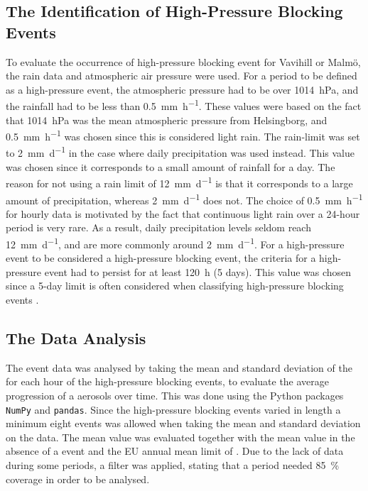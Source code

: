 \subsection{The Identification of High-Pressure Blocking Events}
To evaluate the occurrence of high-pressure blocking event for Vavihill or Malmö, the rain data and atmospheric air pressure were used. For a period to be defined as a high-pressure event, the atmospheric pressure had to be over \SI{1014}{\hecto\pascal}, and the rainfall had to be less than \SI{0.5}{\mm\per\hour}. These values were based on the fact that \SI{1014}{\hecto\pascal} was the mean atmospheric pressure from Helsingborg, and \SI{0.5}{\mm\per\hour} was chosen since this is considered light rain. The rain-limit was set to \SI{2}{\mm\per\day} in the case where daily precipitation was used instead. This value was chosen since it corresponds to a small amount of rainfall for a day. The reason for not using a rain limit of \SI{12}{\mm\per\day} is that it corresponds to a large amount of precipitation, whereas \SI{2}{\mm\per\day} does not. The choice of \SI{0.5}{\mm\per\hour} for hourly data is motivated by the fact that continuous light rain over a 24-hour period is very rare. As a result, daily precipitation levels seldom reach \SI{12}{\mm\per\day}, and are more commonly around \SI{2}{\mm\per\day}. For a high-pressure event to be considered a high-pressure blocking event, the criteria for a high-pressure event had to persist for at least \SI{120}{\hour} (5 days). This value was chosen since a 5-day limit is often considered when classifying high-pressure blocking events \cite{lupoAtmosphericBlockingEvents2020}. 

\subsection{The Data Analysis}
The event data was analysed by taking the mean and standard deviation of the \PM for each hour of the high-pressure blocking events, to evaluate the average progression of a aerosols over time. This was done using the Python packages \texttt{NumPy} and \texttt{pandas}. Since the high-pressure blocking events varied in length a minimum eight events was allowed when taking the mean and standard deviation on the \PM data. The mean \PM value was evaluated together with the mean \PM value in the absence of a event and the EU annual mean limit of \PM. Due to the lack of \PM data during some periods, a filter was applied, stating that a period needed \SI{85}{\%} \PM coverage in order to be analysed.

